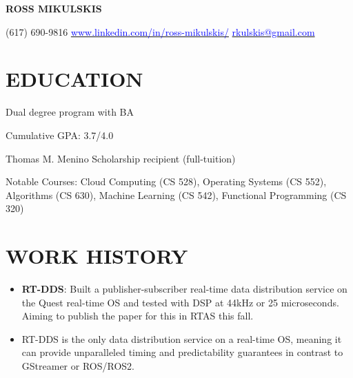 \documentclass[10pt]{article}
\begin{document}
\begin{FlushLeft}

  \begin{center}
    {\bf ROSS MIKULSKIS}
  \end{center}

  (617) 690-9816 \hfill \hspace{25pt} \href{www.linkedin.com/in/ross-mikulskis/}{\textcolor{blue}{www.linkedin.com/in/ross-mikulskis/}} \hfill \href{mailto:rkulskis@gmail.com}{\textcolor{blue}{rkulskis@gmail.com}}
  \section{EDUCATION}
  \vspace{1.5em}
  \begin{itemize}{
      \item Dual degree program with BA
    }
  \end{itemize}
  
  \begin{itemize}{
    \item Cumulative GPA: 3.7/4.0
    \item Thomas M. Menino Scholarship recipient (full-tuition)
    \item Notable Courses: Cloud Computing (CS 528), Operating Systems (CS 552), \\ Algorithms (CS 630), Machine Learning (CS 542), Functional Programming (CS 320)
    }
  \end{itemize}

  
\section{WORK HISTORY}

\begin{itemize}
\item \textbf{RT-DDS}: Built a publisher-subscriber real-time data distribution service on the Quest real-time OS and tested with DSP at 44kHz or 25 microseconds. Aiming to publish the paper for this in RTAS this fall.
  \item RT-DDS is the only data distribution service on a real-time OS, meaning it can provide unparalleled timing and predictability guarantees in contrast to GStreamer or ROS/ROS2.
\end{itemize}


\end{FlushLeft}
\end{document}
